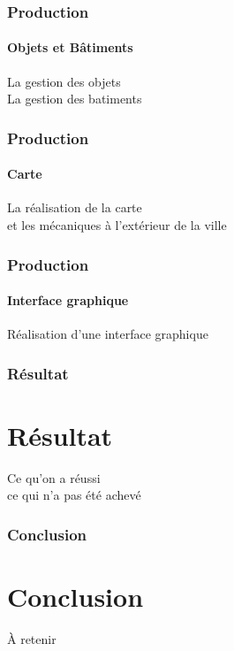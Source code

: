 \documentclass{beamer}
\begin{document}
    
    \begin{frame}
        \frametitle{Production}
        \framesubtitle{Objets et Bâtiments}
        La gestion des objets
        \\ La gestion des batiments
    \end{frame}
    
    
    \begin{frame}
        \frametitle{Production}
        \framesubtitle{Carte}
        La réalisation de la carte
        \\ et les mécaniques à l'extérieur de la ville
    \end{frame}
    
    
    \begin{frame}
        \frametitle{Production}
        \framesubtitle{Interface graphique}
        Réalisation d'une interface graphique
    \end{frame}
    
    
    \begin{frame}
        \frametitle{Résultat}
        \section{Résultat}
        Ce qu'on a réussi
        \\ ce qui n'a pas été achevé
    \end{frame}
    
    
    \begin{frame}
        \frametitle{Conclusion}
        \section{Conclusion}
        À retenir
    \end{frame}
    
\end{document}
